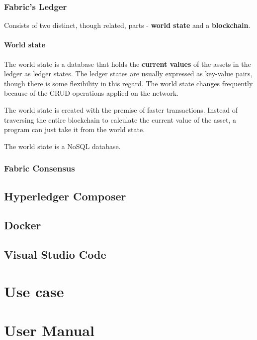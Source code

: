 \documentclass[a4paper,11pt]{report}
\begin{document}
\subsection{Fabric's Ledger}
\label{fabricLedger}
	Consists of two distinct, though related, parts - \textbf{world state} and  a \textbf{blockchain}.
	
	\subsubsection{World state}
	The world state is a database that holds the \textbf{current values} of the assets in the ledger as ledger states. The ledger states are usually expressed as key-value pairs, though there is some flexibility in this regard. The world state changes frequently because of the CRUD operations applied on the network. 
	
	The world state is created with the premise of faster transactions. Instead of traversing the entire blockchain to calculate the current value of the asset, a program can just take it from the world state. 

	The world state is a NoSQL database.
\subsection{Fabric Consensus}
\label{fabricConsensus}

\section{Hyperledger Composer}
\label{hplComposer}

\section{Docker}
\label{docker}

\section{Visual Studio Code}
\label{vsCode}
\chapter{Use case}
\label{usecase}


\chapter{User Manual}
\label{usermanual}
\end{document}
